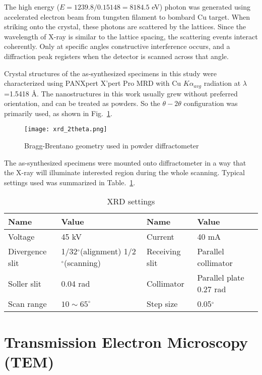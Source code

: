 The high energy ($E = 1239.8/0.15148= 8184.5$ eV) photon was generated using accelerated electron beam from tungsten filament to bombard Cu target. When striking onto the crystal, these photons are scattered by the lattices. Since the wavelength of X-ray is similar to the lattice spacing, the scattering events interact coherently. Only at specific angles constructive interference occurs, and a diffraction peak registers when the detector is scanned across that angle.  

Crystal structures of the as-synthesized specimens in this study were characterized using PANXpert X’pert Pro MRD with Cu $K\alpha_{avg}$ radiation at $\lambda$=1.5418 \AA. The nanostructures in this work usually grew without preferred orientation, and can be treated as powders. So the $\theta-2\theta$ configuration was primarily used, as shown in Fig.~\ref{fig:ch2theta}. 

\begin{figure}[htb]
\centering
\texttt{[image: xrd\_2theta.png]}

\caption[XRD configuration]{Bragg-Brentano geometry used in powder diffractometer}
\label{fig:ch2theta}
\end{figure}

The as-synthesized specimens were mounted onto diffractometer in a way that the X-ray will illuminate interested region during the whole scanning. Typical settings used was summarized in Table.~\ref{tab:ch2xrd}.

\begin{table}[htb]
\centering
\caption{XRD settings}\label{tab:ch2xrd}
\begin{tabular}{lp{2in}lp{2in}}
\toprule
Name & Value & Name & Value  \\
\midrule
Voltage   & 45 kV & Current & 40 mA \\
Divergence slit & 1/32$^\circ$(alignment) 1/2$^\circ$(scanning) & Receiving slit& Parallel collimator \\
Soller slit & 0.04 rad & Collimator & Parallel plate 0.27 rad \\
Scan range & $10 \sim 65 ^\circ$ & Step size & 0.05$^\circ$ \\
\bottomrule
\end{tabular}
\end{table}


\section{Transmission Electron Microscopy (TEM)}

